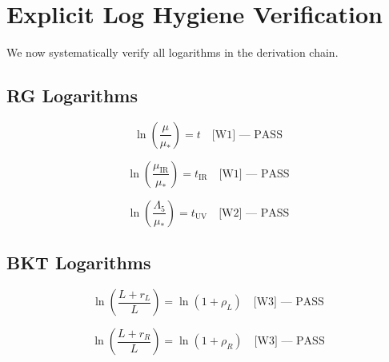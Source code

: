 \documentclass[11pt,a4paper]{article}
\theoremstyle{definition}
\begin{document}
\section{Explicit Log Hygiene Verification}
\label{sec:log_verification}

We now systematically verify all logarithms in the derivation chain.

\subsection{RG Logarithms}
\label{subsec:rg_logs}

\begin{equation}
\label{eq:log_rg_1}
\ln\left(\frac{\mu}{\mu_*}\right) = t \quad \text{[W1] — PASS}
\end{equation}

\begin{equation}
\label{eq:log_rg_2}
\ln\left(\frac{\mu_{\text{IR}}}{\mu_*}\right) = t_{\text{IR}} \quad \text{[W1] — PASS}
\end{equation}

\begin{equation}
\label{eq:log_rg_3}
\ln\left(\frac{\Lambda_5}{\mu_*}\right) = t_{\text{UV}} \quad \text{[W2] — PASS}
\end{equation}

\subsection{BKT Logarithms}
\label{subsec:bkt_logs}

\begin{equation}
\label{eq:log_bkt_1}
\ln\left(\frac{L + r_L}{L}\right) = \ln(1 + \rho_L) \quad \text{[W3] — PASS}
\end{equation}

\begin{equation}
\label{eq:log_bkt_2}
\ln\left(\frac{L + r_R}{L}\right) = \ln(1 + \rho_R) \quad \text{[W3] — PASS}
\end{equation}
\end{document}
